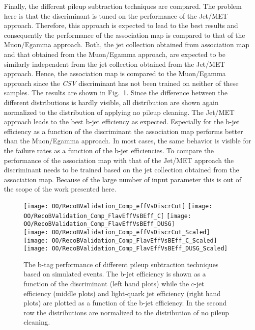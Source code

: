 Finally, the different pileup subtraction techniques are compared. The problem here is that the discriminant is tuned on the performance of the Jet/MET approach. Therefore, this approach is expected to lead to the best results and consequently the performance of the association map is compared to that of the Muon/Egamma approach. Both, the jet collection obtained from association map and that obtained from the Muon/Egamma approach, are expected to be similarly independent from the jet collection obtained from the Jet/MET approach. Hence, the association map is compared to the Muon/Egamma approach since the \textit{CSV} discriminant has not been trained on neither of these samples. The results are shown in Fig.~\ref{plot:OOBTaggingComp}. Since the difference between the different distributions is hardly visible, all distribution are shown again normalized to the distribution of applying no pileup cleaning. The Jet/MET approach leads to the best b-jet efficiency as expected. Especially for the b-jet efficiency as a function of the discriminant the association map performs better than the Muon/Egamma approach. In most cases, the same behavior is visible for the failure rates as a function of the b-jet efficiencies. To compare the performance of the association map with that of the Jet/MET approach the discriminant needs to be trained based on the jet collection obtained from the association map. Because of the large number of input parameter this is out of the scope of the work presented here. 


\begin{figure}[h!t]
  \centering
  \texttt{[image: OO/RecoBValidation\_Comp\_effVsDiscrCut]}
  \texttt{[image: OO/RecoBValidation\_Comp\_FlavEffVsBEff\_C]}
  \texttt{[image: OO/RecoBValidation\_Comp\_FlavEffVsBEff\_DUSG]}
  \\
  \texttt{[image: OO/RecoBValidation\_Comp\_effVsDiscrCut\_Scaled]}
  \texttt{[image: OO/RecoBValidation\_Comp\_FlavEffVsBEff\_C\_Scaled]}
  \texttt{[image: OO/RecoBValidation\_Comp\_FlavEffVsBEff\_DUSG\_Scaled]}
  \caption[B tag performance of different pileup subtraction techniques based on simulated \ttbar events]{The b-tag performance of different pileup subtraction techniques based on simulated \ttbar events. The b-jet efficiency is shown as a function of the discriminant (left hand plots) while the c-jet efficiency (middle plots) and light-quark jet efficiency (right hand plots) are plotted as a function of the b-jet efficiency. In the second row the distributions are normalized to the distribution of no pileup cleaning. \label{plot:OOBTaggingComp}}
\end{figure}

